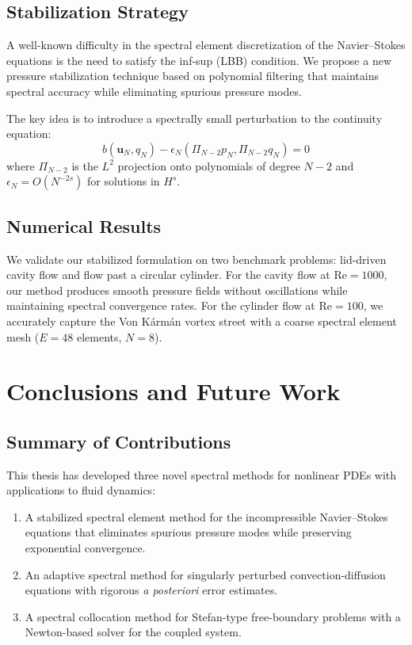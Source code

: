 \documentclass[12pt,a4paper,oneside]{report}
\begin{document}
\section{Stabilization Strategy}

A well-known difficulty in the spectral element discretization of the Navier--Stokes equations is the need to satisfy the inf-sup (LBB) condition. We propose a new pressure stabilization technique based on polynomial filtering that maintains spectral accuracy while eliminating spurious pressure modes.

The key idea is to introduce a spectrally small perturbation to the continuity equation:
\begin{equation}
  b(\mathbf{u}_N, q_N) - \epsilon_N (\Pi_{N-2} p_N, \Pi_{N-2} q_N) = 0
\end{equation}
where $\Pi_{N-2}$ is the $L^2$ projection onto polynomials of degree $N-2$ and $\epsilon_N = O(N^{-2s})$ for solutions in $H^s$.

\section{Numerical Results}

We validate our stabilized formulation on two benchmark problems: lid-driven cavity flow and flow past a circular cylinder. For the cavity flow at $\text{Re} = 1000$, our method produces smooth pressure fields without oscillations while maintaining spectral convergence rates. For the cylinder flow at $\text{Re} = 100$, we accurately capture the Von K\'{a}rm\'{a}n vortex street with a coarse spectral element mesh ($E = 48$ elements, $N = 8$).

\chapter{Conclusions and Future Work}
\label{ch:conclusions}

\section{Summary of Contributions}

This thesis has developed three novel spectral methods for nonlinear PDEs with applications to fluid dynamics:

\begin{enumerate}
\item A stabilized spectral element method for the incompressible Navier--Stokes equations that eliminates spurious pressure modes while preserving exponential convergence.

\item An adaptive spectral method for singularly perturbed convection-diffusion equations with rigorous \textit{a posteriori} error estimates.

\item A spectral collocation method for Stefan-type free-boundary problems with a Newton-based solver for the coupled system.
\end{enumerate}
\end{document}
